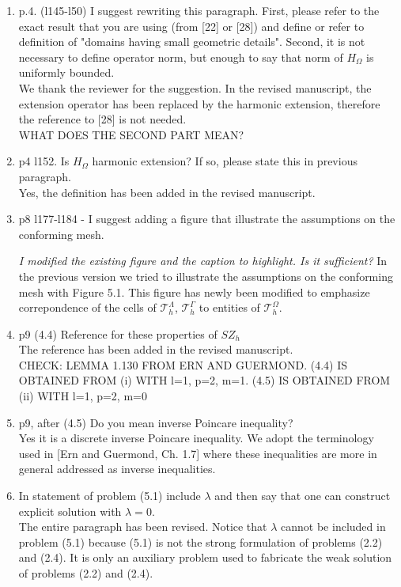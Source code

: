 \documentclass{article}
\newcommand{\fede}[1]{{\color{green!55!blue}#1}}
\newcommand{\miro}[1]{{\color{blue}#1}}
\begin{document}
\begin{enumerate}
    \item p.4. (l145-l50) I suggest rewriting this paragraph. First, please refer to the exact result that you are using (from [22] or [28]) and define or refer to definition of "domains having small geometric details". Second, it is not necessary to define operator norm, but enough to say that norm of $H_{\Omega}$ is uniformly bounded.\\
    \fede{We thank the reviewer for the suggestion. In the revised manuscript, the extension operator has been replaced by the harmonic extension, therefore the reference to [28] is not needed.\\
    WHAT DOES THE SECOND PART MEAN? }
    \item p4 l152. Is $H_{\Omega}$ harmonic extension? If so, please state this in previous paragraph.\\
    \fede{Yes, the definition has been added in the revised manuscript.}
  \item p8 l177-l184 - I suggest adding a figure that illustrate the assumptions on the conforming mesh.

    \miro{
      \textit{I modified the existing figure and the caption to highlight.
        Is it sufficient?}
      In the previous version we tried to illustrate the assumptions on the conforming
      mesh with Figure 5.1. This figure has newly been modified to emphasize
      correpondence of the cells of $\mathcal{T}^{\Lambda}_h$, $\mathcal{T}^{\Gamma}_h$ to
      entities of $\mathcal{T}^{\Omega}_h$.
      }
    
    \item p9 (4.4) Reference for these properties of $SZ_h$\\
    \fede{The reference has been added in the revised manuscript.\\
    
    CHECK: LEMMA 1.130 FROM ERN AND GUERMOND. (4.4) IS OBTAINED FROM (i) WITH l=1, p=2, m=1. (4.5) IS OBTAINED FROM (ii) WITH l=1, p=2, m=0}
    \item p9, after (4.5) Do you mean inverse Poincare inequality?\\
    \fede{Yes it is a discrete inverse Poincare inequality. We adopt the terminology used in [Ern and Guermond, Ch. 1.7] where these inequalities are more in general addressed as inverse inequalities. }
    \item In statement of problem (5.1) include $\lambda$ and then say that one can construct explicit solution with $\lambda=0$.\\
    \fede{The entire paragraph has been revised. Notice that $\lambda$ cannot be included in problem (5.1) because (5.1) is not the strong formulation of problems (2.2) and (2.4). It is only an auxiliary problem used to fabricate the weak solution of problems (2.2) and (2.4).}
\end{enumerate}
\end{document}
